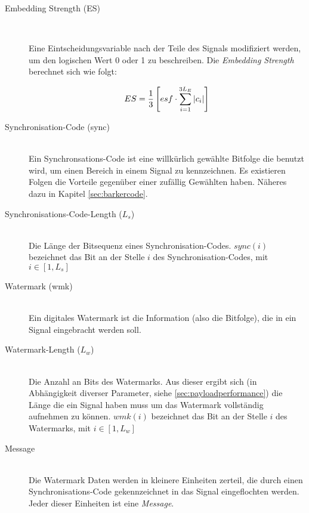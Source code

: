 \begin{description}
\item[Embedding Strength (ES)] \hfill \\ 

Eine Eintscheidungsvariable nach der Teile des Signals modifiziert werden, um den logischen Wert 0 oder 1 zu beschreiben. Die \textit{Embedding Strength} berechnet sich wie folgt:

	\begin{equation}
		ES = {1 \over 3} \left[ esf \cdot \sum\limits_{i=1}^{3{L}_{E}}|c_i| \right] \label{equ:embeddingstrength}
	\end{equation}
		
\item[Synchronisation-Code (sync)] \hfill \\ 
Ein Synchronsations-Code ist eine willk\"urlich gew\"ahlte Bitfolge die benutzt wird, um einen Bereich in einem Signal zu kennzeichnen. Es existieren Folgen die Vorteile gegen\"uber einer zuf\"allig Gew\"ahlten haben. N\"aheres dazu in Kapitel \ref{sec:barkercode}.

\item[Synchronisations-Code-Length (${L}_{s}$)] \hfill \\ 
Die L\"ange der Bitsequenz eines Synchronisation-Codes. $sync(i)$ bezeichnet das Bit an der Stelle $i$ des Synchronisation-Codes, mit $i\in[1,{L}_{s}]$
	
\item[Watermark (wmk)] \hfill \\ 
Ein digitales Watermark ist die Information (also die Bitfolge), die in ein Signal eingebracht werden soll. 

\item[Watermark-Length (${L}_{w}$)] \hfill \\ 
Die Anzahl an Bits des Watermarks. Aus dieser ergibt sich (in Abh\"angigkeit diverser Parameter, siehe \ref{sec:payloadperformance}) die L\"ange die ein Signal haben muss um das Watermark vollst\"andig aufnehmen zu k\"onnen. $wmk(i)$ bezeichnet das Bit an der Stelle $i$ des Watermarks, mit $i\in[1,{L}_{w}]$

\item[Message] \hfill \\ 
Die Watermark Daten werden in kleinere Einheiten zerteil, die durch einen Synchronisations-Code gekennzeichnet in das Signal eingeflochten werden. Jeder dieser Einheiten ist eine \textit{Message}. 
	

\end{description}
